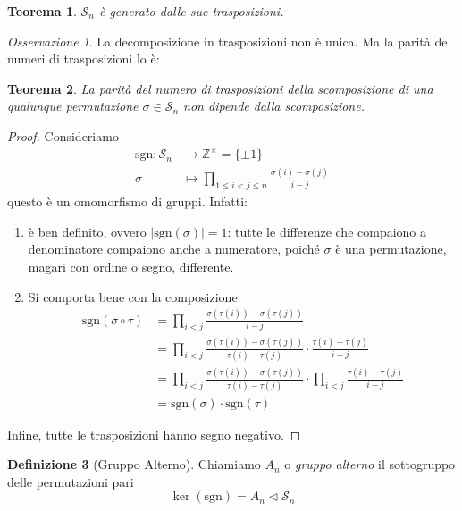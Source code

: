 \documentclass[a4paper]{article}
\newtheorem{theorem}{Teorema}[section]
\theoremstyle{remark}
\newtheorem*{remark}{Osservazione}
\theoremstyle{definition}
\newtheorem{definition}[theorem]{Definizione}
\newcommand{\fun}[5]{\begin{align*}
	#1 \colon #2 &\to #3 \\
	#4 &\mapsto #5
	\end{align*}}
\begin{document}
\begin{multicols}{2}
\begin{theorem}
	$ \mathcal{S}_n $ è generato dalle sue trasposizioni.
\end{theorem}
\begin{remark}
	La decomposizione in trasposizioni non è unica. Ma la parità del numeri di trasposizioni lo è:
\end{remark}
\begin{theorem}
	La parità del numero di trasposizioni della scomposizione di una qualunque permutazione $ \sigma \in \mathcal{S}_n $ non dipende dalla scomposizione.
\end{theorem}
\begin{proof}
	Consideriamo
	\fun{\text{sgn}}{\mathcal{S}_n}{\mathbb{Z}^\times = \{\pm 1\}}{\sigma}{\prod_{1 \leq i < j \leq n}\frac{\sigma(i)-\sigma(j)}{i-j}}
	questo è un omomorfismo di gruppi. Infatti:
	\begin{enumerate}
		\item è ben definito, ovvero $ |\text{sgn}(\sigma)| = 1 $: tutte le differenze che compaiono a denominatore compaiono anche a numeratore, poiché $ \sigma $ è una permutazione, magari con ordine o segno, differente.
		\item Si comporta bene con la composizione
		\begin{align*}
			\text{sgn}(\sigma \circ \tau) &= \prod_{i < j}\frac{\sigma(\tau(i))-\sigma(\tau(j))}{i-j} \\
			& = \prod_{i < j}\frac{\sigma(\tau(i))-\sigma(\tau(j))}{\tau(i)-\tau(j)}\cdot \frac{\tau(i)-\tau(j)}{i-j} \\
			& = \prod_{i < j}\frac{\sigma(\tau(i))-\sigma(\tau(j))}{\tau(i)-\tau(j)}\cdot\prod_{i < j} \frac{\tau(i)-\tau(j)}{i-j}\\
			& = \text{sgn}(\sigma)\cdot \text{sgn}(\tau)
		\end{align*}
	\end{enumerate}
	Infine, tutte le trasposizioni hanno segno negativo. 
\end{proof}
\begin{definition}[Gruppo Alterno]
	Chiamiamo $ A_n $ o \emph{gruppo alterno} il sottogruppo delle permutazioni pari
	\[ \ker(\text{sgn}) = A_n \lhd \mathcal{S}_n \]
\end{definition}


\end{multicols}
\end{document}
